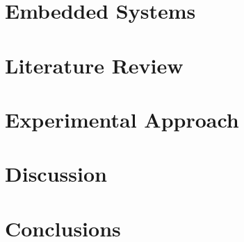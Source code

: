 \documentclass[11pt, oneside]{book}
\begin{document}
    \chapter{Embedded Systems}
    

    \chapter{Literature Review}
    

    \chapter{Experimental Approach}
    

    \chapter{Discussion}
    

    \chapter{Conclusions}
    

    \nocite{*}
    \printbibliography[title={Bibliography}] 

    \appendix
    
    
    
\end{document}
